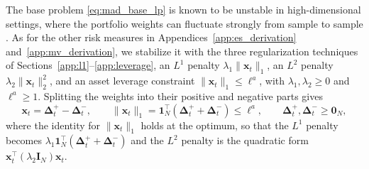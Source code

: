 The base problem \eqref{eq:mad_base_lp} is known to be unstable in high-dimensional settings, where the portfolio weights
can fluctuate strongly from sample to sample \cite{kondor2007noise}. As for the other risk measures in Appendices~\ref{app:es_derivation} and~\ref{app:mv_derivation}, we stabilize it with
the three regularization techniques of Sections~\ref{app:l1}--\ref{app:leverage}, an $L^1$ penalty
$\lambda_1 \|\bm{x}_t\|_1$, an $L^2$ penalty $\lambda_2 \|\bm{x}_t\|_2^2$, and an asset leverage constraint
$\|\bm{x}_t\|_1 \le \ell^a$, with $\lambda_1, \lambda_2 \ge 0$ and $\ell^a \ge 1$. Splitting the weights into their
positive and negative parts gives
\begin{equation} \label{eq:mad_l1_decomp}
    \bm{x}_t = \bm{\Delta}_t^+ - \bm{\Delta}_t^-, \qquad
    \|\bm{x}_t\|_1 = \bm{1}_N^\top (\bm{\Delta}_t^+ + \bm{\Delta}_t^-) \le \ell^a, \qquad
    \bm{\Delta}_t^+, \bm{\Delta}_t^- \ge \bm{0}_N,
\end{equation}
where the identity for $\|\bm{x}_t\|_1$ holds at the optimum, so that the $L^1$ penalty becomes
$\lambda_1 \bm{1}_N^\top (\bm{\Delta}_t^+ + \bm{\Delta}_t^-)$ and the $L^2$ penalty is the quadratic form
$\bm{x}_t^\top (\lambda_2 \bm{I}_N) \bm{x}_t$.

